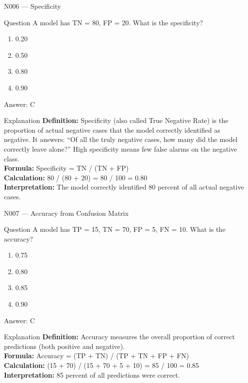 \documentclass[aspectratio=169,8pt]{beamer}
\begin{document}
	\begin{frame}{N006 --- Specificity}
		\begin{block}{Question}
			A model has TN = 80, FP = 20. What is the specificity?
			\begin{enumerate}
				\item 0.20
				\item 0.50
				\item 0.80
				\item 0.90
			\end{enumerate}
		\end{block}
		\begin{exampleblock}{Answer: C}\end{exampleblock}
		\begin{block}{Explanation}
			\textbf{Definition:} Specificity (also called True Negative Rate) is the proportion of actual negative cases that the model correctly identified as negative. It answers: ``Of all the truly negative cases, how many did the model correctly leave alone?'' High specificity means few false alarms on the negative class.\\
			\textbf{Formula:} Specificity = TN / (TN + FP)\\
			\textbf{Calculation:} 80 / (80 + 20) = 80 / 100 = 0.80\\
			\textbf{Interpretation:} The model correctly identified 80 percent of all actual negative cases.
		\end{block}
	\end{frame}
	
	\begin{frame}{N007 --- Accuracy from Confusion Matrix}
		\begin{block}{Question}
			A model has TP = 15, TN = 70, FP = 5, FN = 10. What is the accuracy?
			\begin{enumerate}
				\item 0.75
				\item 0.80
				\item 0.85
				\item 0.90
			\end{enumerate}
		\end{block}
		\begin{exampleblock}{Answer: C}\end{exampleblock}
		\begin{block}{Explanation}
			\textbf{Definition:} Accuracy measures the overall proportion of correct predictions (both positive and negative).\\
			\textbf{Formula:} Accuracy = (TP + TN) / (TP + TN + FP + FN)\\
			\textbf{Calculation:} (15 + 70) / (15 + 70 + 5 + 10) = 85 / 100 = 0.85\\
			\textbf{Interpretation:} 85 percent of all predictions were correct.
		\end{block}
	\end{frame}
	
\end{document}
